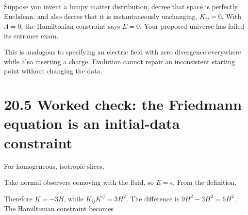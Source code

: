 \documentclass[
  11pt,
  letterpaper,
  oneside,
  openany]{scrbook}
\begin{document}
Suppose you invent a lumpy matter distribution, decree that space is
perfectly Euclidean, and also decree that it is instantaneously
unchanging, \(K_{ij}=0\). With \(\Lambda=0\), the Hamiltonian constraint
says \(E=0\). Your proposed universe has failed its entrance exam.

This is analogous to specifying an electric field with zero divergence
everywhere while also inserting a charge. Evolution cannot repair an
inconsistent starting point without changing the data.

\hypertarget{worked-check-the-friedmann-equation-is-an-initial-data-constraint}{%
\section{20.5 Worked check: the Friedmann equation is an initial-data
constraint}\label{worked-check-the-friedmann-equation-is-an-initial-data-constraint}}

For homogeneous, isotropic slices,

\begin{center}
\begingroup
{}
\ifdim\wd\grmathbox>\linewidth
\resizebox{\linewidth}{!}{\usebox{\grmathbox}}
\else\usebox{\grmathbox}\fi
\endgroup
\end{center}

Take normal observers comoving with the fluid, so \(E=\epsilon\). From
the definition,

\begin{center}
\begingroup
{}
\ifdim\wd\grmathbox>\linewidth
\resizebox{\linewidth}{!}{\usebox{\grmathbox}}
\else\usebox{\grmathbox}\fi
\endgroup
\end{center}

Therefore \(K=-3H\), while \(K_{ij}K^{ij}=3H^2\). The difference is
\(9H^2-3H^2=6H^2\). The Hamiltonian constraint becomes

\begin{center}
\begingroup
{}
\ifdim\wd\grmathbox>\linewidth
\resizebox{\linewidth}{!}{\usebox{\grmathbox}}
\else\usebox{\grmathbox}\fi
\endgroup
\end{center}
\end{document}
